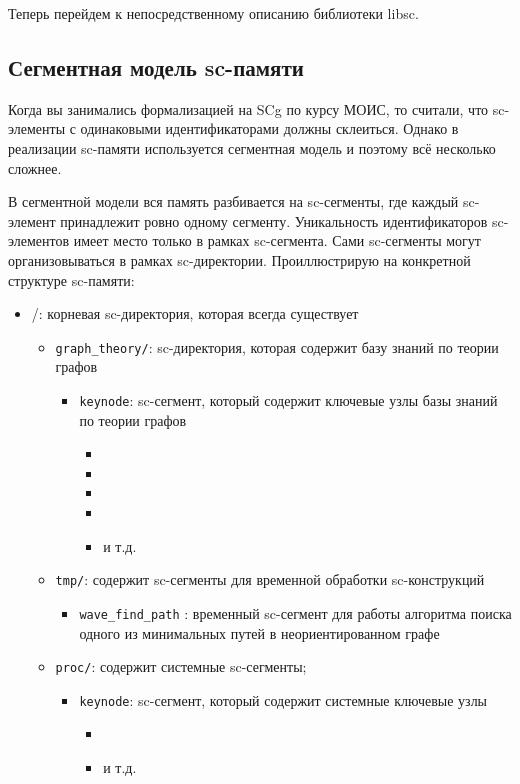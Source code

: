 Теперь перейдем к непосредственному описанию библиотеки libsc.

\subsection{Сегментная модель sc-памяти}

Когда вы занимались формализацией на SCg по курсу МОИС, то считали,
что sc-элементы с одинаковыми идентификаторами должны
склеиться. Однако в реализации sc-памяти используется сегментная
модель и поэтому всё несколько сложнее.

В сегментной модели вся память разбивается на sc-сегменты, где каждый
sc-элемент принадлежит ровно одному сегменту. Уникальность
идентификаторов sc-элементов имеет место только в рамках
sc-сегмента. Сами sc-сегменты могут организовываться в рамках
sc-директории. Проиллюстрирую на конкретной структуре sc-памяти:

\begin{itemize}
\item /: корневая sc-директория, которая всегда существует
  
  \begin{itemize}
  \item \verb|graph_theory/|: sc-директория, которая содержит базу знаний по
    теории графов
    \begin{itemize}
    \item \verb|keynode|: sc-сегмент, который содержит ключевые
      узлы базы знаний по теории графов
      \begin{itemize}
      \item {}
      \item {}
      \item {}
      \item {}
      \item {} и т.д.
      \end{itemize}
    \end{itemize}

  \item \verb|tmp/|: содержит sc-сегменты для временной обработки
    sc-конструкций
    \begin{itemize}
    \item \verb|wave_find_path| : временный sc-сегмент для работы алгоритма
      поиска одного из минимальных путей в неориентированном графе
    \end{itemize}

  \item \verb|proc/|: содержит системные sc-сегменты;
    \begin{itemize}
    \item \verb|keynode|: sc-сегмент, который содержит системные ключевые
      узлы
      \begin{itemize}
      \item {}
      \item {} и т.д.
      \end{itemize}
    \end{itemize}
  \end{itemize}
\end{itemize}

